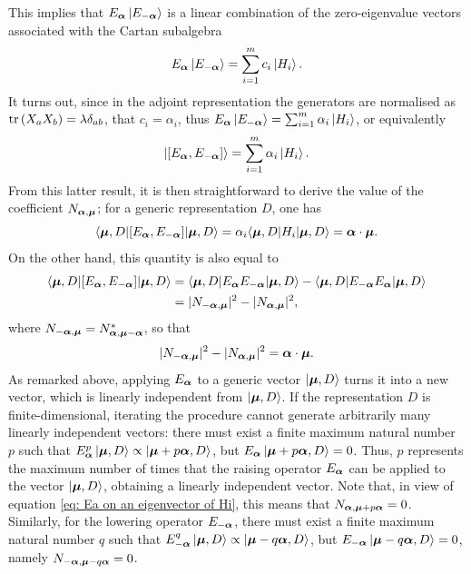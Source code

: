 This implies that $E_{\bm{\alpha}}\ket{E_{-\bm{\alpha}}}$ is a linear combination of the zero-eigenvalue vectors associated with the Cartan subalgebra
\begin{equation}
    E_{\bm{\alpha}}\ket{E_{-\bm{\alpha}}} = \sum_{i=1}^m c_i\ket{H_i}.
\end{equation}
It turns out, since in the adjoint representation the generators are normalised as $\mathrm{tr}\,{(X_aX_b)} = \lambda\delta_{ab}$, that $c_i = \alpha_i$, thus $E_{\bm{\alpha}}\ket{E_{-\bm{\alpha}}} = \sum_{i=1}^m \alpha_i\ket{H_i}$, or equivalently
\begin{equation}
    \ket{[E_{\bm{\alpha}},E_{-\bm{\alpha}}]} = \sum_{i=1}^m \alpha_i\ket{H_i}.
\end{equation}
From this latter result, it is then straightforward to derive the value of the coefficient $N_{\bm{\alpha},\bm{\mu}}$; for a generic representation $D$, one has
\begin{equation}
    \langle \bm{\mu},D | [E_{\bm{\alpha}},E_{-\bm{\alpha}}] | \bm{\mu},D \rangle = \alpha_i\langle \bm{\mu},D | H_i | \bm{\mu},D \rangle = \bm{\alpha} \cdot \bm{\mu}.
\end{equation}
On the other hand, this quantity is also equal to
\begin{equation}
    \begin{split}
        \langle \bm{\mu},D | [E_{\bm{\alpha}},E_{-\bm{\alpha}}] | \bm{\mu},D \rangle &= \langle \bm{\mu},D | E_{\bm{\alpha}}E_{-\bm{\alpha}} | \bm{\mu},D \rangle - \langle \bm{\mu},D | E_{-\bm{\alpha}}E_{\bm{\alpha}} | \bm{\mu},D \rangle \\
        &= |N_{-\bm{\alpha},\bm{\mu}}|^2 - |N_{\bm{\alpha},\bm{\mu}}|^2,
    \end{split}
\end{equation}
where $N_{-\bm{\alpha},\bm{\mu}} = N^*_{\bm{\alpha},\bm{\mu} - \bm{\alpha}}$, so that 
\begin{equation}
    |N_{-\bm{\alpha},\bm{\mu}}|^2 - |N_{\bm{\alpha},\bm{\mu}}|^2 = \bm{\alpha} \cdot \bm{\mu}.
\end{equation}
As remarked above, applying $E_{\bm{\alpha}}$ to a generic vector $\ket{\bm{\mu},D}$ turns it into a new vector, which is linearly independent from $\ket{\bm{\mu},D}$. If the representation $D$ is finite-dimensional, iterating the procedure cannot generate arbitrarily many linearly independent vectors: there must exist a finite maximum natural number $p$ such that $E_{\bm{\alpha}}^p\ket{\bm{\mu},D} \propto \ket{\bm{\mu} + p\bm{\alpha},D}$, but $E_{\bm{\alpha}}\ket{\bm{\mu} + p\bm{\alpha},D} = 0$. Thus, $p$ represents the maximum number of times that the raising operator $E_{\bm{\alpha}}$ can be applied to the vector $\ket{\bm{\mu},D}$, obtaining a linearly independent vector. Note that, in view of equation \eqref{eq: Ea on an eigenvector of Hi}, this means that $N_{\bm{\alpha},\bm{\mu} + p\bm{\alpha}} = 0$. Similarly, for the lowering operator $E_{-\bm{\alpha}}$, there must exist a finite maximum natural number $q$ such that $E_{-\bm{\alpha}}^q\ket{\bm{\mu},D} \propto \ket{\bm{\mu} - q\bm{\alpha},D}$, but $E_{-\bm{\alpha}}\ket{\bm{\mu} - q\bm{\alpha},D} = 0$, namely $N_{-\bm{\alpha},\bm{\mu} - q\bm{\alpha}} = 0$. 

